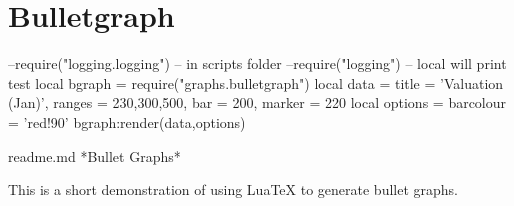 \documentclass{article}
\makeatletter
\newenvironment {bulletgraph} {\luacode@begin\luacode@table@soft} {}
\makeatother
\begin{document}
\section{Bulletgraph}


\begin{bulletgraph}
--require("logging.logging") -- in scripts folder
--require("logging") -- local will print test
local  bgraph = require("graphs.bulletgraph")
 local data = {
     title = 'Valuation (Jan)',
     ranges = {230,300,500},
     bar = 200,
     marker = 220}
     local options = {
        barcolour = 'red!90'
   } 
bgraph:render(data,options)        
\end{bulletgraph}

\begin{filecontents*}{readme.md}
*Bullet Graphs*

This is a short demonstration of using LuaTeX to generate bullet graphs.
\end{filecontents*}
\end{document}
